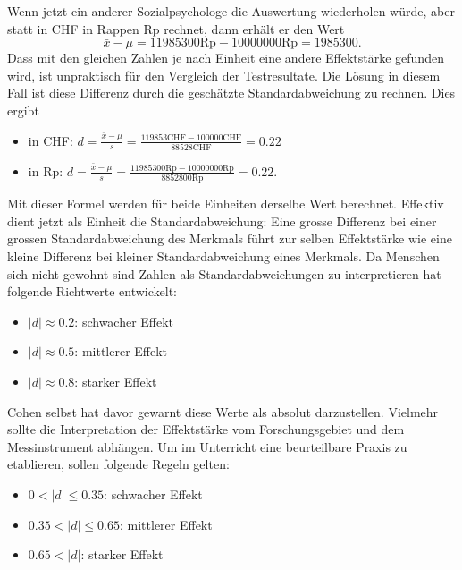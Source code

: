 \documentclass[
]{book}
\providecommand{\tightlist}{%
  \setlength{\itemsep}{0pt}\setlength{\parskip}{0pt}}
\theoremstyle{definition}
\theoremstyle{definition}
\theoremstyle{definition}
\theoremstyle{definition}
\theoremstyle{remark}
\begin{document}
Wenn jetzt ein anderer Sozialpsychologe die Auswertung wiederholen würde, aber statt in CHF in Rappen Rp rechnet, dann erhält er den Wert
\[\bar{x} - \mu = 11985300 \text{Rp} - 10000000 \text{Rp}  = 1985300.\]
Dass mit den gleichen Zahlen je nach Einheit eine andere Effektstärke gefunden wird, ist unpraktisch für den Vergleich der Testresultate. Die Lösung in diesem Fall ist diese Differenz durch die geschätzte Standardabweichung zu rechnen. Dies ergibt

\begin{itemize}
\tightlist
\item
  in CHF: \(d = \frac{\bar{x} - \mu}{s} = \frac{119853 \text{CHF} - 100000 \text{CHF}}{88528\text{CHF}}  = 0.22\)
\item
  in Rp: \(d = \frac{\bar{x} - \mu}{s} = \frac{11985300 \text{Rp} - 10000000 \text{Rp}}{8852800\text{Rp}}  = 0.22 .\)
\end{itemize}

Mit dieser Formel werden für beide Einheiten derselbe Wert berechnet. Effektiv dient jetzt als Einheit die Standardabweichung: Eine grosse Differenz bei einer grossen Standardabweichung des Merkmals führt zur selben Effektstärke wie eine kleine Differenz bei kleiner Standardabweichung eines Merkmals. Da Menschen sich nicht gewohnt sind Zahlen als Standardabweichungen zu interpretieren hat \citep{cohen1988} folgende Richtwerte entwickelt:

\begin{itemize}
\tightlist
\item
  \(|d| \approx 0.2\): schwacher Effekt
\item
  \(|d| \approx 0.5\): mittlerer Effekt
\item
  \(|d| \approx 0.8\): starker Effekt
\end{itemize}

Cohen selbst hat davor gewarnt diese Werte als absolut darzustellen. Vielmehr sollte die Interpretation der Effektstärke vom Forschungsgebiet und dem Messinstrument abhängen. Um im Unterricht eine beurteilbare Praxis zu etablieren, sollen folgende Regeln gelten:

\begin{itemize}
\tightlist
\item
  \(0 < |d| \leq 0.35\): schwacher Effekt
\item
  \(0.35 < |d| \leq 0.65\): mittlerer Effekt
\item
  \(0.65 < |d|\): starker Effekt
\end{itemize}
\end{document}
